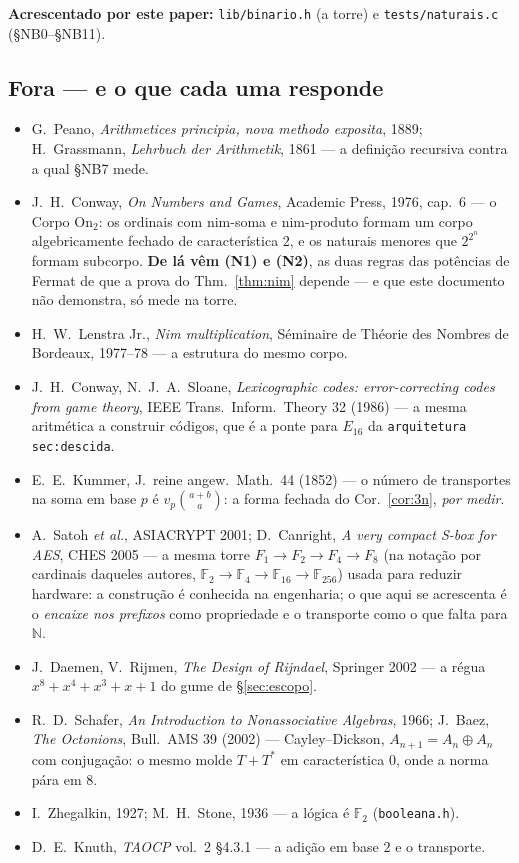 \documentclass[11pt,a4paper]{article}
\newcommand{\code}[1]{\texttt{\small #1}}
\newcommand{\FF}{\mathbb{F}}
\begin{document}
\noindent\textbf{Acrescentado por este paper:} \code{lib/binario.h} (a torre) e
\code{tests/naturais.c} (§NB0--§NB11).

\subsection*{Fora --- e o que cada uma responde}

\begin{itemize}\itemsep2pt
\item G.~Peano, \emph{Arithmetices principia, nova methodo exposita}, 1889;
H.~Grassmann, \emph{Lehrbuch der Arithmetik}, 1861 --- a definição recursiva
contra a qual §NB7 mede.
\item J.~H.~Conway, \emph{On Numbers and Games}, Academic Press, 1976,
cap.~6 --- o Corpo $\mathrm{On}_2$: os ordinais com nim-soma e nim-produto
formam um corpo algebricamente fechado de característica $2$, e os naturais
menores que $2^{2^{n}}$ formam subcorpo. \textbf{De lá vêm (N1) e (N2)}, as
duas regras das potências de Fermat de que a prova do Thm.~\ref{thm:nim}
depende --- e que este documento não demonstra, só mede na torre.
\item H.~W.~Lenstra Jr., \emph{Nim multiplication}, Séminaire de Théorie des
Nombres de Bordeaux, 1977--78 --- a estrutura do mesmo corpo.
\item J.~H.~Conway, N.~J.~A.~Sloane, \emph{Lexicographic codes:
error-correcting codes from game theory}, IEEE Trans.\ Inform.\ Theory 32
(1986) --- a mesma aritmética a construir códigos, que é a ponte para
$E_{16}$ da \code{arquitetura sec:descida}.
\item E.~E.~Kummer, J.~reine angew.\ Math.\ 44 (1852) --- o número de
transportes na soma em base $p$ é $v_p\binom{a+b}{a}$: a forma fechada do
Cor.~\ref{cor:3n}, \emph{por medir}.
\item A.~Satoh \emph{et al.}, ASIACRYPT 2001; D.~Canright, \emph{A very
compact S-box for AES}, CHES 2005 --- a mesma torre
$F_1\to F_2\to F_4\to F_8$ (na notação por cardinais daqueles autores,
$\FF_2\to\FF_4\to\FF_{16}\to\FF_{256}$) usada para reduzir hardware: a
construção é conhecida na engenharia; o que aqui se acrescenta é o
\emph{encaixe nos prefixos} como propriedade e o transporte como o que falta
para $\mathbb{N}$.
\item J.~Daemen, V.~Rijmen, \emph{The Design of Rijndael}, Springer 2002 ---
a régua $x^8+x^4+x^3+x+1$ do gume de §\ref{sec:escopo}.
\item R.~D.~Schafer, \emph{An Introduction to Nonassociative Algebras}, 1966;
J.~Baez, \emph{The Octonions}, Bull.\ AMS 39 (2002) --- Cayley--Dickson,
$A_{n+1}=A_n\oplus A_n$ com conjugação: o mesmo molde $T+T^{*}$ em
característica $0$, onde a norma pára em $8$.
\item I.~Zhegalkin, 1927; M.~H.~Stone, 1936 --- a lógica é $\FF_2$
(\code{booleana.h}).
\item D.~E.~Knuth, \emph{TAOCP} vol.~2 §4.3.1 --- a adição em base $2$ e o
transporte.
\end{itemize}
\end{document}

